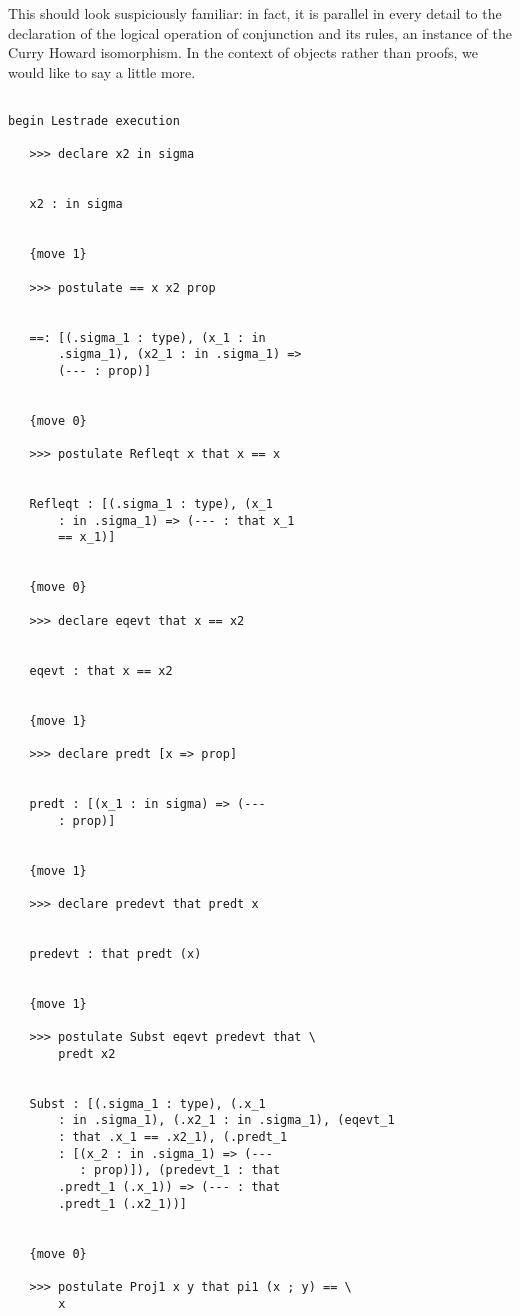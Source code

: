 \documentclass{slides}
\begin{document}
{\begin{slide}
This should look suspiciously familiar:  in fact, it is parallel in every detail to the declaration of the logical operation of conjunction and its rules, an instance of the Curry Howard isomorphism.  In the context of objects rather than proofs, we would like to say a little more.

\end{slide}

\begin{slide}

{\tiny 

\begin{verbatim}

begin Lestrade execution

   >>> declare x2 in sigma


   x2 : in sigma


   {move 1}

   >>> postulate == x x2 prop


   ==: [(.sigma_1 : type), (x_1 : in 
       .sigma_1), (x2_1 : in .sigma_1) => 
       (--- : prop)]


   {move 0}

   >>> postulate Refleqt x that x == x


   Refleqt : [(.sigma_1 : type), (x_1 
       : in .sigma_1) => (--- : that x_1 
       == x_1)]


   {move 0}

   >>> declare eqevt that x == x2


   eqevt : that x == x2


   {move 1}

   >>> declare predt [x => prop]


   predt : [(x_1 : in sigma) => (--- 
       : prop)]


   {move 1}

   >>> declare predevt that predt x


   predevt : that predt (x)


   {move 1}

   >>> postulate Subst eqevt predevt that \
       predt x2


   Subst : [(.sigma_1 : type), (.x_1 
       : in .sigma_1), (.x2_1 : in .sigma_1), (eqevt_1 
       : that .x_1 == .x2_1), (.predt_1 
       : [(x_2 : in .sigma_1) => (--- 
          : prop)]), (predevt_1 : that 
       .predt_1 (.x_1)) => (--- : that 
       .predt_1 (.x2_1))]


   {move 0}

   >>> postulate Proj1 x y that pi1 (x ; y) == \
       x



\end{verbatim}}
\end{slide}}
\end{document}
